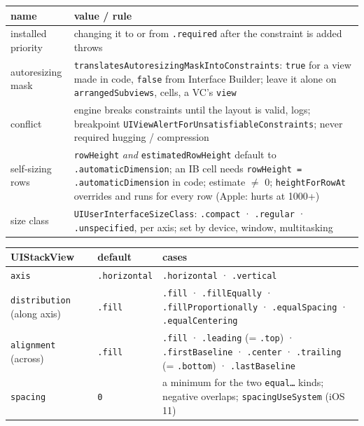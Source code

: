 \documentclass[8pt]{extarticle}
\newcommand\ct[1]{\texttt{#1}}
\newcommand\hd[1]{\par\vspace{3pt}\noindent{\small\bfseries\color{sheetBlue}#1}\par\vspace{1pt}}
\begin{document}
\begin{multicols}{2}
\raggedright
\footnotesize{}
\setlength{\parskip}{1.5pt plus 0.5pt}

\hd{Auto Layout}
{\scriptsize\setlength{\tabcolsep}{2pt}
\begin{tabular}{@{}L{17mm}L{61mm}@{}}
\toprule
\textbf{name} & \textbf{value / rule}\\
\midrule
installed priority & changing it to or from \ct{.required} after the constraint is added throws\\
autoresizing mask & \ct{translatesAutoresizingMaskIntoConstraints}: \ct{true} for a view made in code, \ct{false} from Interface Builder; leave it alone on \ct{arrangedSubviews}, cells, a VC's \ct{view}\\
conflict & engine breaks constraints until the layout is valid, logs; breakpoint \ct{UIViewAlertForUnsatisfiable}\allowbreak\ct{Constraints}; never required hugging / compression\\
self-sizing rows & \ct{rowHeight} \emph{and} \ct{estimatedRowHeight} default to \ct{.automaticDimension}; an IB cell needs \ct{rowHeight = .automaticDimension} in code; estimate $\ne$ 0; \ct{heightForRowAt} overrides and runs for every row (Apple: hurts at 1000+)\\
size class & \ct{UIUserInterfaceSizeClass}: \ct{.compact} · \ct{.regular} · \ct{.unspecified}, per axis; set by device, window, multitasking\\
\bottomrule
\end{tabular}}

\medskip
{\scriptsize\setlength{\tabcolsep}{2pt}
\begin{tabular}{@{}L{17mm}L{12mm}L{48mm}@{}}
\toprule
\textbf{UIStackView} & \textbf{default} & \textbf{cases}\\
\midrule
\ct{axis} & \ct{.horizontal} & \ct{.horizontal} · \ct{.vertical}\\
\ct{distribution} (along axis) & \ct{.fill} & \ct{.fill} · \ct{.fillEqually} · \ct{.fillProportionally} · \ct{.equalSpacing} · \ct{.equalCentering}\\
\ct{alignment} (across) & \ct{.fill} & \ct{.fill} · \ct{.leading} (= \ct{.top}) · \ct{.firstBaseline} · \ct{.center} · \ct{.trailing} (= \ct{.bottom}) · \ct{.lastBaseline}\\
\ct{spacing} & \ct{0} & a minimum for the two \ct{equal…} kinds; negative overlaps; \ct{spacingUseSystem} (iOS 11)\\
\bottomrule
\end{tabular}}


\end{multicols}
\end{document}
